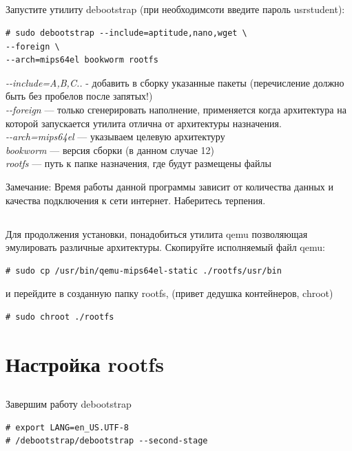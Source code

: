\subsection{} Запустите утилиту debootstrap (при необходимсоти введите пароль usrstudent):
\begin{lstlisting}[style=bash]
# sudo debootstrap --include=aptitude,nano,wget \
--foreign \
--arch=mips64el bookworm rootfs
\end{lstlisting}
\textit{-{}-include=A,B,C..} - добавить в сборку указанные пакеты (перечисление должно быть без пробелов после запятых!)\\
\textit{-{}-foreign} — только сгенерировать наполнение, применяется когда архитектура на которой запускается утилита отлична от архитектуры назначения. \\
\textit{-{}-arch=mips64el} — указываем целевую архитектуру \\
\textit{bookworm} — версия сборки (в данном случае 12) \\
\textit{rootfs} — путь к папке назначения, где будут размещены файлы \\

\begin{Notes}{Замечание:}
	Время работы данной программы зависит от количества данных и качества подключения к сети интернет. Наберитесь терпения.
\end{Notes}

\subsection{} Для продолжения установки, понадобиться утилита qemu позволяющая эмулировать различные архитектуры. Скопируйте исполняемый файл qemu:
\begin{lstlisting}[style=bash]
# sudo cp /usr/bin/qemu-mips64el-static ./rootfs/usr/bin
\end{lstlisting}
и перейдите в созданную папку rootfs, (привет дедушка контейнеров, chroot)
\begin{lstlisting}[style=bash]
# sudo chroot ./rootfs
\end{lstlisting}


\section{Настройка rootfs}

\subsection{} Завершим работу debootstrap
\begin{lstlisting}[style=bash]
# export LANG=en_US.UTF-8
# /debootstrap/debootstrap --second-stage
\end{lstlisting}

